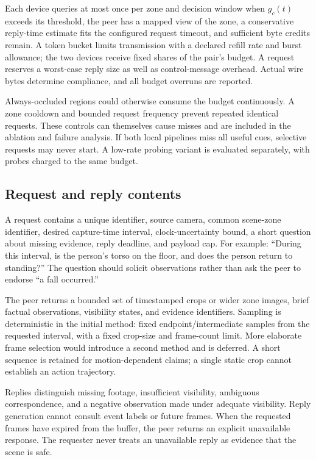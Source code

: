 \documentclass[10pt,a4paper]{article}
\begin{document}
Each device queries at most once per zone and decision window when $g_c(t)$ exceeds its threshold, the peer has a mapped view of the zone, a conservative reply-time estimate fits the configured request timeout, and sufficient byte credits remain. A token bucket limits transmission with a declared refill rate and burst allowance; the two devices receive fixed shares of the pair's budget. A request reserves a worst-case reply size as well as control-message overhead. Actual wire bytes determine compliance, and all budget overruns are reported.

Always-occluded regions could otherwise consume the budget continuously. A zone cooldown and bounded request frequency prevent repeated identical requests. These controls can themselves cause misses and are included in the ablation and failure analysis. If both local pipelines miss all useful cues, selective requests may never start. A low-rate probing variant is evaluated separately, with probes charged to the same budget.

\subsection{Request and reply contents}
A request contains a unique identifier, source camera, common scene-zone identifier, desired capture-time interval, clock-uncertainty bound, a short question about missing evidence, reply deadline, and payload cap. For example: ``During this interval, is the person's torso on the floor, and does the person return to standing?'' The question should solicit observations rather than ask the peer to endorse ``a fall occurred.''

The peer returns a bounded set of timestamped crops or wider zone images, brief factual observations, visibility states, and evidence identifiers. Sampling is deterministic in the initial method: fixed endpoint/intermediate samples from the requested interval, with a fixed crop-size and frame-count limit. More elaborate frame selection would introduce a second method and is deferred. A short sequence is retained for motion-dependent claims; a single static crop cannot establish an action trajectory.

Replies distinguish missing footage, insufficient visibility, ambiguous correspondence, and a negative observation made under adequate visibility. Reply generation cannot consult event labels or future frames. When the requested frames have expired from the buffer, the peer returns an explicit unavailable response. The requester never treats an unavailable reply as evidence that the scene is safe.
\end{document}
